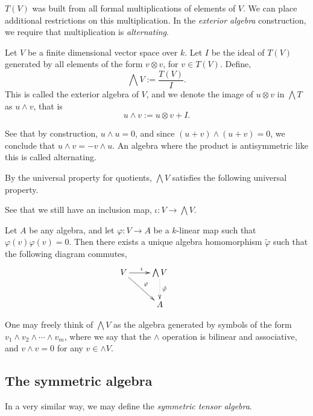 \documentclass{owmaths}
\begin{document}
$T(V)$ was built from all formal multiplications of elements of $V$. We 
can place additional restrictions on this multiplication. In the \emph{exterior algebra}
construction, we require that multiplication is \emph{alternating}.
\begin{definition}
    Let $V$ be a finite dimensional vector space over $k$. 
    Let $I$ be the ideal of $T(V)$ generated by all elements of the form
    $v \otimes v$, for $v \in T(V)$.
    Define,
    \begin{equation*}
        \bigwedge V := \frac{T(V)}{I}.
    \end{equation*}
    This is called the exterior algebra of $V$, and we denote
    the image of $u \otimes v$ in $\bigwedge T$ as $u \wedge v$, that is
    \begin{equation*}
        u \wedge v := u \otimes v + I.
    \end{equation*}
    
    See that by construction, $u \wedge u = 0$, and since $(u+v)\wedge(u+v) = 0$,
    we conclude that $u\wedge v = - v \wedge u$. An algebra where the product
    is antisymmetric like this is called alternating.
\end{definition}

By the universal property for quotients, $\bigwedge V$ satisfies the following
universal property.
\begin{proposition}
    See that we still have an inclusion map, $\iota:V\rightarrow \bigwedge V$.
    
    Let $A$ be any algebra, and let $\varphi:V\rightarrow A$
    be a $k$-linear map such that $\varphi(v)\varphi(v) = 0$. Then there exists
    a unique algebra homomorphism $\tilde{\varphi}$ such that the following diagram
    commutes,
    \begin{displaymath}
    \xymatrix{
        V \ar[r]^\iota \ar[rd]^\varphi&
        \bigwedge V \ar@{.>}[d]^{\tilde{\varphi}}&\\
        &
        A
    }   
    \end{displaymath}
\end{proposition}

One may freely think of $\bigwedge V$ as the algebra
generated by symbols of the form $v_1 \wedge v_2 \wedge \cdots \wedge v_m$,
where we say that the $\wedge$ operation is bilinear and associative, and $v \wedge v = 0$
for any $v \in \wedge V$.

\subsection{The symmetric algebra}
In a very similar way, we may define the \emph{symmetric tensor algebra}.
\end{document}
